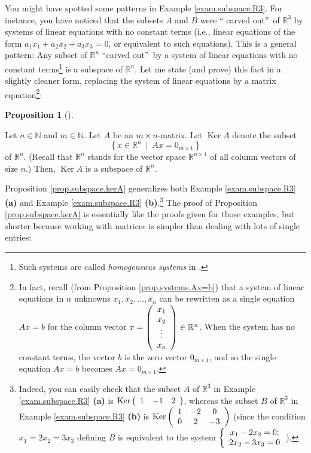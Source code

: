 \documentclass[numbers=enddot,12pt,final,onecolumn,notitlepage]{scrartcl}%
\theoremstyle{definition}
\newtheorem{prop}[theo]{Proposition}
\newenvironment{proposition}[1][]
{\begin{prop}[#1]\begin{leftbar}}
{\end{leftbar}\end{prop}}
\begin{document}
You might have spotted some patterns in Example \ref{exam.subspace.R3}. For
instance, you have noticed that the subsets $A$ and $B$ were \textquotedblleft
carved out\textquotedblright\ of $\mathbb{R}^{3}$ by systems of linear
equations with no constant terms (i.e., linear equations of the form
$a_{1}x_{1}+a_{2}x_{2}+a_{3}x_{3}=0$, or equivalent to such equations). This
is a general pattern: Any subset of $\mathbb{R}^{n}$ \textquotedblleft carved
out\textquotedblright\ by a system of linear equations with no constant
terms\footnote{Such systems are called \textit{homogeneous systems} in
\cite[\S 1.8]{OlvSha06}.} is a subspace of $\mathbb{R}^{n}$. Let me state (and
prove) this fact in a slightly cleaner form, replacing the system of linear
equations by a matrix equation\footnote{In fact, recall (from Proposition
\ref{prop.systems.Ax=b}) that a system of linear equations in $n$ unknowns
$x_{1},x_{2},\ldots,x_{n}$ can be rewritten as a single equation $Ax=b$ for
the column vector $x=\left(
\begin{array}
[c]{c}%
x_{1}\\
x_{2}\\
\vdots\\
x_{n}%
\end{array}
\right)  \in\mathbb{R}^{n}$. When the system has no constant terms, the vector
$b$ is the zero vector $0_{m\times1}$, and so the single equation $Ax=b$
becomes $Ax=0_{m\times1}$.}:

\begin{proposition}
\label{prop.subspace.kerA}Let $n\in\mathbb{N}$ and $m\in\mathbb{N}$. Let $A$
be an $m\times n$-matrix. Let $\operatorname*{Ker}A$ denote the subset%
\[
\left\{  x\in\mathbb{R}^{n}\ \mid\ Ax=0_{m\times1}\right\}
\]
of $\mathbb{R}^{n}$. (Recall that $\mathbb{R}^{n}$ stands for the vector space
$\mathbb{R}^{n\times1}$ of all column vectors of size $n$.) Then,
$\operatorname*{Ker}A$ is a subspace of $\mathbb{R}^{n}$.
\end{proposition}

Proposition \ref{prop.subspace.kerA} generalizes both Example
\ref{exam.subspace.R3} \textbf{(a)} and Example \ref{exam.subspace.R3}
\textbf{(b)}.\footnote{Indeed, you can easily check that the subset $A$ of
$\mathbb{R}^{3}$ in Example \ref{exam.subspace.R3} \textbf{(a)} is
$\operatorname*{Ker}\left(
\begin{array}
[c]{ccc}%
1 & -1 & 2
\end{array}
\right)  $, whereas the subset $B$ of $\mathbb{R}^{3}$ in Example
\ref{exam.subspace.R3} \textbf{(b)} is $\operatorname*{Ker}\left(
\begin{array}
[c]{ccc}%
1 & -2 & 0\\
0 & 2 & -3
\end{array}
\right)  $ (since the condition $x_{1}=2x_{2}=3x_{3}$ defining $B$ is
equivalent to the system $\left\{
\begin{array}
[c]{c}%
x_{1}-2x_{2}=0;\\
2x_{2}-3x_{3}=0
\end{array}
\right.  $).} The proof of Proposition \ref{prop.subspace.kerA} is essentially
like the proofs given for those examples, but shorter because working with
matrices is simpler than dealing with lots of single entries:
\end{document}

